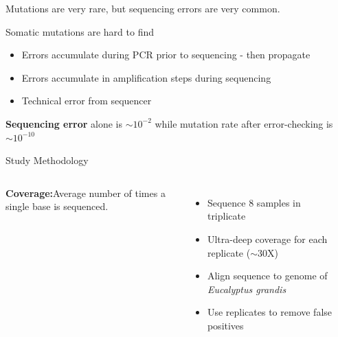 \documentclass{beamer}
\begin{document}


\begin{frame}{Mutations are very rare, but sequencing errors are very common.}

Somatic mutations are hard to find

\begin{itemize}
\item Errors accumulate during PCR prior to sequencing - then propagate
\item Errors accumulate in amplification steps during sequencing
\item Technical error from sequencer
\end{itemize}

\textbf{Sequencing error} alone is \textbf{$\sim10^{-2}$} while mutation rate after error-checking is \textbf{$\sim10^{-10}$}

\end{frame}

\begin{frame}{Study Methodology}
\begin{columns}

\begin{definition}
\textbf{Coverage:}Average number of times a single base is sequenced.
\end{definition}
\begin{itemize}
\item Sequence 8 samples in triplicate
\item Ultra-deep coverage for each replicate ($\sim$30X)
\item Align sequence to genome of \textit{Eucalyptus grandis}
\item Use replicates to remove false positives
\end{itemize}

\begin{center}
\end{center}
\end{columns}
\end{frame}
\end{document}
